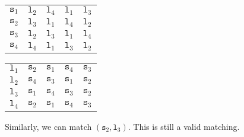 \documentclass[a4paper, openany]{memoir}
\begin{document}
    \begin{table}[H]
        \centering
        \begin{subtable}{0.45\textwidth}
            \centering
            \begin{tabular}{c|cccc}
                $\texttt{s}_1$ & \underline{$\texttt{l}_2$} & $\texttt{l}_4$ & $\texttt{l}_1$ & $\texttt{l}_3$ \\
                $\texttt{s}_2$ & \underline{$\texttt{l}_3$} & $\texttt{l}_1$ & $\texttt{l}_4$ & $\texttt{l}_2$ \\
                $\texttt{s}_3$ & $\texttt{l}_2$ & $\texttt{l}_3$ & $\texttt{l}_1$ & $\texttt{l}_4$ \\
                $\texttt{s}_4$ & $\texttt{l}_4$ & $\texttt{l}_1$ & $\texttt{l}_3$ & $\texttt{l}_2$
            \end{tabular}
        \end{subtable}
        \hfill
        \begin{subtable}{0.45\textwidth}
            \centering
            \begin{tabular}{c|cccc}
                $\texttt{l}_1$ & $\texttt{s}_2$ & $\texttt{s}_1$ & $\texttt{s}_4$ & $\texttt{s}_3$ \\
                $\texttt{l}_2$ & $\texttt{s}_4$ & $\texttt{s}_3$ & \underline{$\texttt{s}_1$} & $\texttt{s}_2$ \\
                $\texttt{l}_3$ & $\texttt{s}_1$ & $\texttt{s}_4$ & $\texttt{s}_3$ & \underline{$\texttt{s}_2$} \\
                $\texttt{l}_4$ & $\texttt{s}_2$ & $\texttt{s}_1$ & $\texttt{s}_4$ & $\texttt{s}_3$
            \end{tabular}
        \end{subtable}
    \end{table}
    \noindent Similarly, we can match $(\texttt{s}_2, \texttt{l}_3)$. This is still a valid matching.
\end{document}
